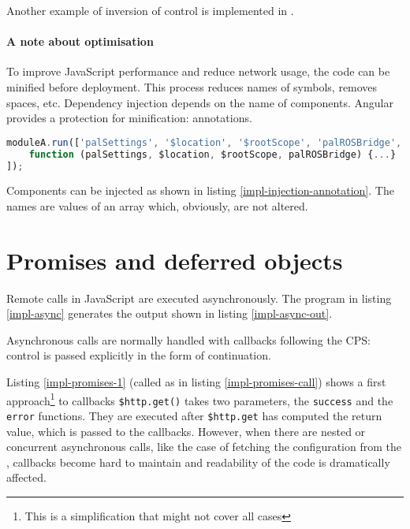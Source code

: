 

Another example of inversion of control is implemented in .

\paragraph{A note about optimisation} To improve JavaScript performance and reduce network usage, the code can be minified before deployment.
This process reduces names of symbols, removes spaces, etc.
Dependency injection depends on the name of components. 
Angular provides a protection for minification: annotations.
\begin{lstlisting}[caption=Annotations to protect injection, language=javascript, label=impl-injection-annotation]
moduleA.run(['palSettings', '$location', '$rootScope', 'palROSBridge', 
    function (palSettings, $location, $rootScope, palROSBridge) {...} 
]);

\end{lstlisting}
Components can be injected as shown in listing \ref{impl-injection-annotation}.
The names are values of an array which, obviously, are not altered.

\section{Promises and deferred objects}
Remote calls in JavaScript are executed asynchronously.
The program in listing \ref{impl-async} generates the output shown in listing \ref{impl-async-out}.




Asynchronous calls are normally handled with callbacks following the \ac{CPS}: control is passed explicitly in the form of continuation.





Listing \ref{impl-promises-1} (called as in listing \ref{impl-promises-call}) shows a first approach\footnote{This is a simplification that might not cover all cases} to callbacks \texttt{\$http.get()} takes two parameters, the \texttt{success} and the \texttt{error} functions. 
They are executed after \texttt{\$http.get} has computed the return value, which is passed to the callbacks.
However, when there are nested or concurrent asynchronous calls, like the case of fetching the configuration from the \flangobe , callbacks become hard to maintain and readability of the code is dramatically affected.


